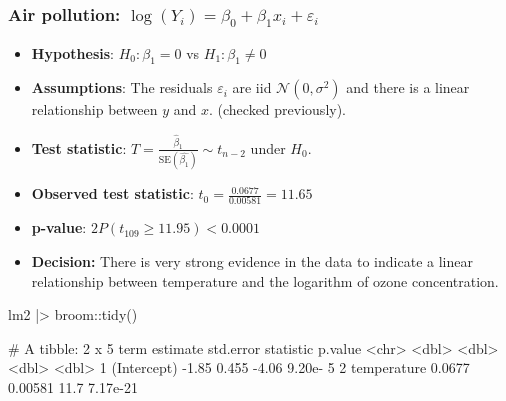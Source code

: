 \documentclass[a4paper]{article}
\begin{document}
\subsubsection{Air pollution: \( \log(Y_i) = \beta_0 + \beta_1 x_i + \varepsilon_i \)}
\begin{itemize}
	\item \textbf{Hypothesis}: \( H_0: \beta_1=0 \) vs \( H_1: \beta_1 \neq 0 \)
	\item \textbf{Assumptions}: The residuals \( \varepsilon_i \) are iid \( \mathcal{N}(0,\sigma^2) \) and there is a linear relationship between \( y \) and \( x \). (checked previously).
	\item \textbf{Test statistic}: \( T = \frac{\hat{\beta}_1}{\text{SE}(\hat{\beta_1})} \sim t_{n-2} \) under \( H_0 \).
	\item \textbf{Observed test statistic}: \( t_0 = \frac{0.0677}{0.00581} = 11.65 \)
	\item \textbf{p-value}: \( 2P(t_{109}\geq 11.95) < 0.0001 \) 
	\item \textbf{Decision:} There is very strong evidence in the data to indicate a linear relationship between temperature and the logarithm of ozone concentration.
\end{itemize}
\begin{Schunk}
\begin{Sinput}
lm2 |> broom::tidy()
\end{Sinput}
\begin{Soutput}
# A tibble: 2 x 5
  term        estimate std.error statistic  p.value
  <chr>          <dbl>     <dbl>     <dbl>    <dbl>
1 (Intercept)  -1.85     0.455       -4.06 9.20e- 5
2 temperature   0.0677   0.00581     11.7  7.17e-21
\end{Soutput}
\end{Schunk}
\end{document}
